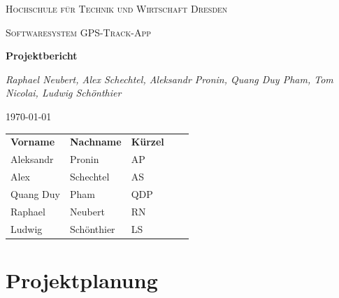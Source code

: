 \documentclass[10pt]{article}
\begin{document}
\begin{titlepage}
    \centering
    {\scshape\LARGE Hochschule für Technik und Wirtschaft Dresden \par}
    \vspace{1cm}
    {\scshape\Large Softwaresystem \glqq GPS-Track-App\grqq\par}
    \vspace{1.5cm}
    {\huge\bfseries Projektbericht\par}
    \vspace{2cm}
    {\Large\itshape Raphael Neubert, Alex Schechtel, Aleksandr Pronin, Quang Duy Pham, Tom Nicolai, Ludwig Schönthier\par}
    \vfill

    {\large \today\par}
\end{titlepage}
\tableofcontents
\newpage
\begin{table}[H]
    \begin{tabular}{lllll}
    \textbf{Vorname} & \textbf{Nachname} & \textbf{Kürzel} &  &  \\
    Aleksandr        & Pronin            & AP              &  &  \\
    Alex             & Schechtel         & AS              &  &  \\
    Quang Duy        & Pham              & QDP             &  &  \\
    Raphael          & Neubert           & RN              &  &  \\
    Ludwig           & Schönthier        & LS              &  &
    \end{tabular}
\end{table}
\section{Projektplanung}
\end{document}
